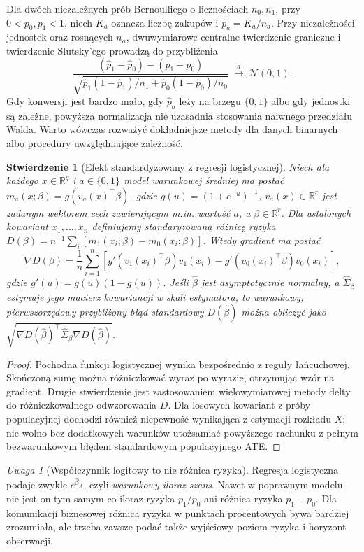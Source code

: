 \documentclass[11pt,a4paper,oneside]{report}
\numberwithin{equation}{chapter}
\theoremstyle{plain}
\newtheorem{stwierdzenie}[twierdzenie]{Stwierdzenie}
\theoremstyle{definition}
\theoremstyle{remark}
\newtheorem{uwaga}{Uwaga}[chapter]
\newcommand{\R}{\mathbb R}
\newcommand{\Normal}{\mathcal N}
\begin{document}
Dla dwóch niezależnych prób Bernoulliego o licznościach $n_0,n_1$, przy $0<p_0,p_1<1$, niech $K_a$ oznacza liczbę zakupów i $\widehat p_a=K_a/n_a$. Przy niezależności jednostek oraz rosnących $n_a$, dwuwymiarowe centralne twierdzenie graniczne i twierdzenie Slutsky'ego prowadzą do przybliżenia
\[
\frac{(\widehat p_1-\widehat p_0)-(p_1-p_0)}{\sqrt{\widehat p_1(1-\widehat p_1)/n_1+\widehat p_0(1-\widehat p_0)/n_0}}\ \overset{d}{\longrightarrow}\ \Normal(0,1).
\]
Gdy konwersji jest bardzo mało, gdy $\widehat p_a$ leży na brzegu $\{0,1\}$ albo gdy jednostki są zależne, powyższa normalizacja nie uzasadnia stosowania naiwnego przedziału Walda. Warto wówczas rozważyć dokładniejsze metody dla danych binarnych albo procedury uwzględniające zależność.

\begin{stwierdzenie}[Efekt standardyzowany z regresji logistycznej]\label{prop:logit-std}
Niech dla każdego $x\in\R^q$ i $a\in\{0,1\}$ model warunkowej średniej ma postać $m_a(x;\beta)=g(v_a(x)^\top\beta)$, gdzie $g(u)=(1+e^{-u})^{-1}$, $v_a(x)\in\R^r$ jest zadanym wektorem cech zawierającym m.in. wartość $a$, a $\beta\in\R^r$. Dla ustalonych kowariant $x_1,\ldots,x_n$ definiujemy \emph{standaryzowaną różnicę ryzyka}
$D(\beta)=n^{-1}\sum_i[m_1(x_i;\beta)-m_0(x_i;\beta)]$.
Wtedy gradient ma postać
\[
\nabla D(\beta)=\frac1n\sum_{i=1}^n\left[g'(v_1(x_i)^\top\beta)v_1(x_i)-g'(v_0(x_i)^\top\beta)v_0(x_i)\right],
\]
gdzie $g'(u)=g(u)(1-g(u))$. Jeśli $\widehat\beta$ jest asymptotycznie normalny, a $\widehat\Sigma_\beta$ estymuje jego macierz kowariancji w skali estymatora, to warunkowy, pierwszorzędowy przybliżony błąd standardowy $D(\widehat\beta)$ można obliczyć jako $\sqrt{\nabla D(\widehat\beta)^\top\widehat\Sigma_\beta\nabla D(\widehat\beta)}$.
\end{stwierdzenie}
\begin{proof}
Pochodna funkcji logistycznej wynika bezpośrednio z reguły łańcuchowej. Skończoną sumę można różniczkować wyraz po wyrazie, otrzymując wzór na gradient. Drugie stwierdzenie jest zastosowaniem wielowymiarowej metody delty do różniczkowalnego odwzorowania $D$. Dla losowych kowariant z próby populacyjnej dochodzi również niepewność wynikająca z estymacji rozkładu $X$; nie wolno bez dodatkowych warunków utożsamiać powyższego rachunku z pełnym bezwarunkowym błędem standardowym populacyjnego ATE.
\end{proof}

\begin{uwaga}[Współczynnik logitowy to nie różnica ryzyka]
Regresja logistyczna podaje zwykle $e^{\widehat\beta_A}$, czyli \emph{warunkowy iloraz szans}. Nawet w poprawnym modelu nie jest on tym samym co iloraz ryzyka $p_1/p_0$ ani różnica ryzyka $p_1-p_0$. Dla komunikacji biznesowej różnica ryzyka w punktach procentowych bywa bardziej zrozumiała, ale trzeba zawsze podać także wyjściowy poziom ryzyka i horyzont obserwacji.
\end{uwaga}
\end{document}
